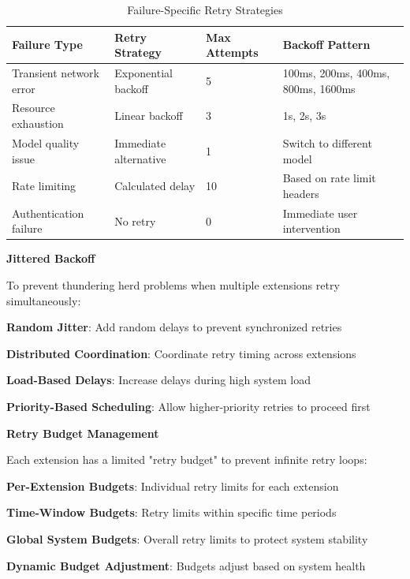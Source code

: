 \begin{table}[h]
\centering
\caption{Failure-Specific Retry Strategies}
\label{tab:retry-strategies}
\begin{tabular}{@{}llll@{}}
\toprule
\textbf{Failure Type} & \textbf{Retry Strategy} & \textbf{Max Attempts} & \textbf{Backoff Pattern} \\
\midrule
Transient network error & Exponential backoff & 5 & 100ms, 200ms, 400ms, 800ms, 1600ms \\
Resource exhaustion & Linear backoff & 3 & 1s, 2s, 3s \\
Model quality issue & Immediate alternative & 1 & Switch to different model \\
Rate limiting & Calculated delay & 10 & Based on rate limit headers \\
Authentication failure & No retry & 0 & Immediate user intervention \\
\bottomrule
\end{tabular}
\end{table}

\textbf{Jittered Backoff}

To prevent thundering herd problems when multiple extensions retry simultaneously:

\begin{compactlist}
    \item \textbf{Random Jitter}: Add random delays to prevent synchronized retries
    \item \textbf{Distributed Coordination}: Coordinate retry timing across extensions
    \item \textbf{Load-Based Delays}: Increase delays during high system load
    \item \textbf{Priority-Based Scheduling}: Allow higher-priority retries to proceed first
\end{compactlist}

\textbf{Retry Budget Management}

Each extension has a limited "retry budget" to prevent infinite retry loops:

\begin{compactlist}
    \item \textbf{Per-Extension Budgets}: Individual retry limits for each extension
    \item \textbf{Time-Window Budgets}: Retry limits within specific time periods
    \item \textbf{Global System Budgets}: Overall retry limits to protect system stability
    \item \textbf{Dynamic Budget Adjustment}: Budgets adjust based on system health
\end{compactlist}

